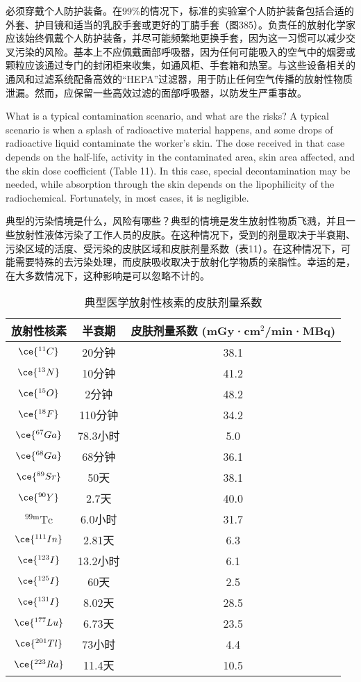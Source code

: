 \documentclass[dvipsnames, svgnames,a4paper,11pt]{article}
\begin{document}
必须穿戴个人防护装备。在99\%的情况下，标准的实验室个人防护装备包括合适的外套、护目镜和适当的乳胶手套或更好的丁腈手套（图385）。负责任的放射化学家应该始终佩戴个人防护装备，并尽可能频繁地更换手套，因为这一习惯可以减少交叉污染的风险。基本上不应佩戴面部呼吸器，因为任何可能吸入的空气中的烟雾或颗粒应该通过专门的封闭柜来收集，如通风柜、手套箱和热室。与这些设备相关的通风和过滤系统配备高效的“HEPA”过滤器，用于防止任何空气传播的放射性物质泄漏。然而，应保留一些高效过滤的面部呼吸器，以防发生严重事故。



What is a typical contamination scenario, and what are the risks? A typical scenario is when a splash of radioactive material happens, and some drops of radioactive liquid contaminate the worker's skin. The dose received in that case depends on the half-life, activity in the contaminated area, skin area affected, and the skin dose coefficient (Table 11). In this case, special decontamination may be needed, while absorption through the skin depends on the lipophilicity of the radiochemical. Fortunately, in most cases, it is negligible.

典型的污染情境是什么，风险有哪些？典型的情境是发生放射性物质飞溅，并且一些放射性液体污染了工作人员的皮肤。在这种情况下，受到的剂量取决于半衰期、污染区域的活度、受污染的皮肤区域和皮肤剂量系数（表11）。在这种情况下，可能需要特殊的去污染处理，而皮肤吸收取决于放射化学物质的亲脂性。幸运的是，在大多数情况下，这种影响是可以忽略不计的。

\begin{table}[h!]
\centering
\begin{tabular}{ccc}
\hline
\textbf{放射性核素} & \textbf{半衰期} & \textbf{皮肤剂量系数 (mGy·cm\(^2\)/min·MBq)} \\
\hline
\(\ce{^{11}C}\) & 20分钟 & 38.1 \\
\(\ce{^{13}N}\) & 10分钟 & 41.2 \\
\(\ce{^{15}O}\) & 2分钟 & 48.2 \\
\(\ce{^{18}F}\) & 110分钟 & 34.2 \\
\(\ce{^{67}Ga}\) & 78.3小时 & 5.0 \\
\(\ce{^{68}Ga}\) & 68分钟 & 36.1 \\
\(\ce{^{89}Sr}\) & 50天 & 38.1 \\
\(\ce{^{90}Y}\) & 2.7天 & 40.0 \\
\(\mathrm{^{99m}Tc}\) & 6.0小时 & 31.7 \\
\(\ce{^{111}In}\) & 2.81天 & 6.3 \\
\(\ce{^{123}I}\) & 13.2小时 & 6.1 \\
\(\ce{^{125}I}\) & 60天 & 2.5 \\
\(\ce{^{131}I}\) & 8.02天 & 28.5 \\
\(\ce{^{177}Lu}\) & 6.73天 & 23.5 \\
\(\ce{^{201}Tl}\) & 73小时 & 4.4 \\
\(\ce{^{223}Ra}\) & 11.4天 & 10.5 \\
\hline
\end{tabular}
\caption{典型医学放射性核素的皮肤剂量系数}
\end{table}
\end{document}
